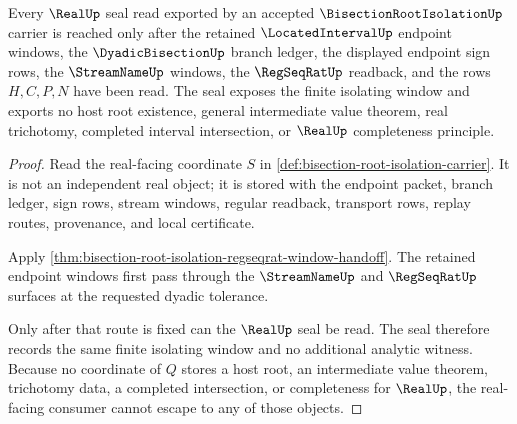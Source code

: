 \begin{theorem}
\label{thm:bisection-root-isolation-real-seal-nonescape}
Every $\RealUp$ seal read exported by an accepted $\BisectionRootIsolationUp$ carrier is reached only after the retained $\LocatedIntervalUp$ endpoint windows, the $\DyadicBisectionUp$ branch ledger, the displayed endpoint sign rows, the $\StreamNameUp$ windows, the $\RegSeqRatUp$ readback, and the rows $H,C,P,N$ have been read. The seal exposes the finite isolating window and exports no host root existence, general intermediate value theorem, real trichotomy, completed interval intersection, or $\RealUp$ completeness principle.
\end{theorem}
\begin{proof}
Read the real-facing coordinate $S$ in \autoref{def:bisection-root-isolation-carrier}. It is not an independent real object; it is stored with the endpoint packet, branch ledger, sign rows, stream windows, regular readback, transport rows, replay routes, provenance, and local certificate.

Apply \autoref{thm:bisection-root-isolation-regseqrat-window-handoff}. The retained endpoint windows first pass through the $\StreamNameUp$ and $\RegSeqRatUp$ surfaces at the requested dyadic tolerance.

Only after that route is fixed can the $\RealUp$ seal be read. The seal therefore records the same finite isolating window and no additional analytic witness. Because no coordinate of $Q$ stores a host root, an intermediate value theorem, trichotomy data, a completed intersection, or completeness for $\RealUp$, the real-facing consumer cannot escape to any of those objects.
\end{proof}

